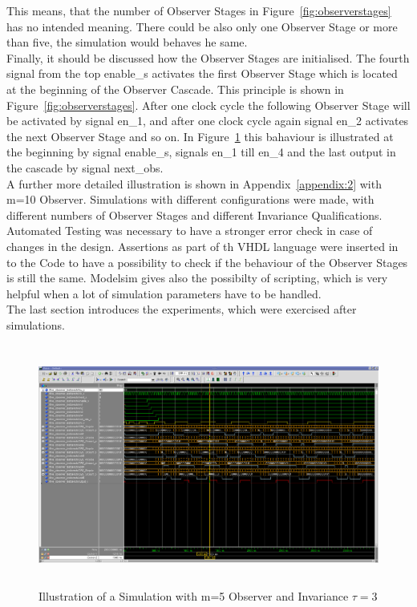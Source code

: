 This means, that the number of Observer Stages in Figure~\ref{fig:observerstages} has no intended meaning.
There could be also only one Observer Stage or more than five, the simulation would behaves he same. \\  
Finally, it should be discussed how the Observer Stages are initialised. The fourth signal from the top enable\_s activates the first Observer Stage which is located at the beginning of the
Observer Cascade. This principle is shown in Figure~\ref{fig:observerstages}. 
After one clock cycle the following Observer Stage will be activated by signal en\_1, and after one clock cycle again signal en\_2 activates the next Observer Stage and so on. 
In Figure~\ref{fig:simulation:five} this bahaviour is illustrated at the beginning by signal enable\_s, signals en\_1 till en\_4 and the last output in the cascade by signal next\_obs.\\

A further more detailed illustration is shown in Appendix~\ref{appendix:2} with m=10 Observer.
Simulations with different configurations were made, with different numbers of Observer Stages and different Invariance Qualifications.
Automated Testing was necessary to have a stronger error check in case of changes in the design. 
Assertions as part of th VHDL language were inserted in to the Code to have a possibility to check if the behaviour of the Observer Stages is still the same. 
Modelsim gives also the possibilty of scripting,  which is very helpful when a lot of simulation parameters have to be handled. \\  
The last section introduces the experiments, which were exercised after simulations.  


\begin{figure}[]
\centering
\includegraphics[width=650px,height=300px,angle=-90]{../../pictures/Modelsim/5_Observer_tb_1.png}
\caption[Modelsim Simulation of 5 Observer]{Illustration of a Simulation with m=5 Observer and Invariance $\tau=3$}
\label{fig:simulation:five}
\end{figure}

